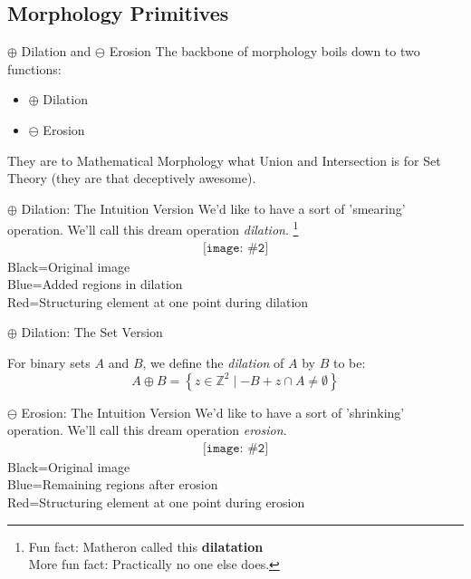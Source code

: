 \documentclass{beamer}
\newcommand{\pic}[2]{
     \begin{array}{l}
      \texttt{[image: \#2]}
      \end{array}
}
\newcommand{\set}[1]{\left\lbrace #1 \right\rbrace}
\newcommand{\buildset}[2]{\set{#1 \mid #2}}
\newcommand{\intersect}{\cap}
\newcommand{\dilate}{\oplus}
\newcommand{\erode}{\ominus}
\begin{document}
\subsection{Morphology Primitives}
\begin{frame}{$\dilate$ Dilation and $\erode$ Erosion}
  The backbone of morphology boils down to two functions:
  \begin{itemize}
    \item $\dilate$ Dilation
    \item $\erode$ Erosion
  \end{itemize}
  They are to Mathematical Morphology what Union and Intersection is for
  Set Theory (they are that deceptively awesome).
\end{frame}
\begin{frame}{$\dilate$ Dilation: The Intuition Version}
  We'd like to have a sort of 'smearing' operation. 
  We'll call this dream operation \emph{dilation}.
  \footnote{Fun fact: Matheron called this \textbf{dilatation}\\
            More fun fact: Practically no one else does.}
    $$\pic{width=100pt}{images/dilation_example.png}$$
      Black=Original image\\
      Blue=Added regions in dilation\\
      Red=Structuring element at one point during dilation
\end{frame}

\begin{frame}{$\dilate$ Dilation: The Set Version}
  \begin{definition}
    For binary sets $A$ and $B$, we define the \emph{dilation} of $A$ by $B$
    to be:
    $$A \dilate B = \buildset{z \in \mathbb{Z}^2}
                             {-B+z \intersect A \not= \emptyset}$$
  \end{definition}
  
\end{frame}
\begin{frame}{$\erode$ Erosion: The Intuition Version}
  We'd like to have a sort of 'shrinking' operation. 
  We'll call this dream operation \emph{erosion}.
    $$\pic{width=100pt}{images/erosion_example.png}$$
      Black=Original image\\
       Blue=Remaining regions after erosion\\
       Red=Structuring element at one point during erosion
 
\end{frame}
\end{document}
